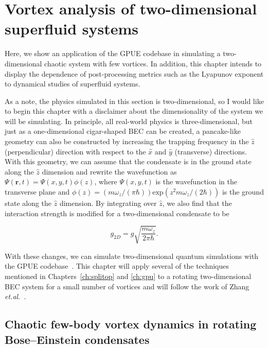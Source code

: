 \chapter{Vortex analysis of two-dimensional superfluid systems}
\label{ch:2d}

Here, we show an application of the GPUE codebase in simulating a two-dimensional chaotic system with few vortices.
In addition, this chapter intends to display the dependence of post-processing metrics such as the Lyapunov exponent to dynamical studies of superfluid systems.

As a note, the physics simulated in this section is two-dimensional, so I would like to begin this chapter with a disclaimer about the dimensionality of the system we will be simulating.
In principle, all real-world physics is three-dimensional, but just as a one-dimensional cigar-shaped BEC can be created, a pancake-like geometry can also be constructed by increasing the trapping frequency in the $\hat z$ (perpendicular) direction with respect to the $\hat x$ and $\hat y$ (transverse) directions.
With this geometry, we can assume that the condensate is in the ground state along the $\hat z$ dimension and rewrite the wavefunction as $\Psi(\mathbf{r},t) = \Psi(x, y, t)\phi(z)$, where $\Psi(x, y, t)$ is the wavefunction in the transverse plane and $\phi(z) = (m \omega_z/(\pi\hbar))\text{exp}(z^2 m\omega_z/(2\hbar))$ is the ground state along the $\hat z$ dimension.
By integrating over $\hat z$, we also find that the interaction strength is modified for a two-dimensional condensate to be

\begin{equation}
g_{2D} = g \sqrt{\frac{m\omega_z}{2\pi\hbar}}.
\end{equation}

\noindent With these changes, we can simulate two-dimensional quantum simulations with the GPUE codebase~\cite{zhang2019, o2017, o2016topo, o2016}.
This chapter will apply several of the techniques mentioned in Chapters~\ref{ch:splitop} and \ref{ch:gpu} to a rotating two-dimensional BEC system for a small number of vortices and will follow the work of Zhang \textit{et.al.}~\cite{zhang2019}.

\section{Chaotic few-body vortex dynamics in rotating Bose--Einstein condensates}

